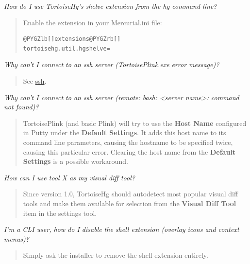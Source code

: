 \documentclass[letterpaper,10pt,english]{manual}
\begin{document}
\emph{How do I use TortoiseHg's shelve extension from the hg command line?}
\begin{quote}

Enable the extension in your Mercurial.ini file:

\begin{Verbatim}[commandchars=@\[\]]
@PYGZlb[]extensions@PYGZrb[]
tortoisehg.util.hgshelve=
\end{Verbatim}
\end{quote}

\emph{Why can't I connect to an ssh server (TortoisePlink.exe}  \emph{error message)?}
\begin{quote}

See \href{http://bitbucket.org/tortoisehg/stable/wiki/ssh}{ssh}.
\end{quote}

\emph{Why can't I connect to an ssh server (remote: bash: \textless{}server name\textgreater{}: command not found)?}
\begin{quote}

TortoisePlink (and basic Plink) will try to use the \textbf{Host
Name} configured in Putty under the \textbf{Default Settings}.
It adds this host name to its command line parameters, causing the
hostname to be specified twice, causing this particular error.
Clearing the host name from the \textbf{Default Settings} is a
possible workaround.
\end{quote}

\emph{How can I use tool X as my visual diff tool?}
\begin{quote}

Since version 1.0, TortoiseHg should autodetect most popular visual
diff tools and make them available for selection from the
\textbf{Visual Diff Tool} item in the settings tool.
\end{quote}

\emph{I'm a CLI user, how do I disable the shell extension (overlay icons and context menus)?}
\begin{quote}

Simply ask the installer to remove the shell extension entirely.
\end{quote}
\end{document}
